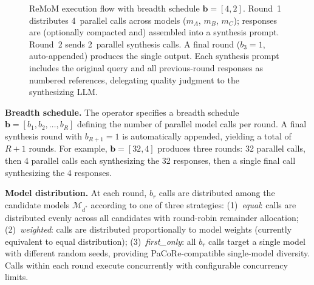 \begin{figure}[t]
{
}
\caption{ReMoM execution flow with breadth schedule $\mathbf{b} = [4, 2]$.
Round~1 distributes 4~parallel calls across models ($m_A$, $m_B$, $m_C$); responses are (optionally compacted and) assembled into a synthesis prompt.
Round~2 sends 2~parallel synthesis calls.
A final round ($b_3 = 1$, auto-appended) produces the single output.
Each synthesis prompt includes the original query and all previous-round responses as numbered references, delegating quality judgment to the synthesizing LLM.}
\label{fig:remom_flow}
\end{figure}

\noindent\textbf{Breadth schedule.}
The operator specifies a breadth schedule $\mathbf{b} = [b_1, b_2, \ldots, b_R]$ defining the number of parallel model calls per round.
A final synthesis round with $b_{R+1} = 1$ is automatically appended, yielding a total of $R+1$ rounds.
For example, $\mathbf{b} = [32, 4]$ produces three rounds: 32 parallel calls, then 4 parallel calls each synthesizing the 32 responses, then a single final call synthesizing the 4 responses.

\noindent\textbf{Model distribution.}
At each round, $b_r$ calls are distributed among the candidate models $\mathcal{M}_{d^*}$ according to one of three strategies:
(1)~\emph{equal}: calls are distributed evenly across all candidates with round-robin remainder allocation;
(2)~\emph{weighted}: calls are distributed proportionally to model weights (currently equivalent to equal distribution);
(3)~\emph{first\_only}: all $b_r$ calls target a single model with different random seeds, providing PaCoRe-compatible single-model diversity.
Calls within each round execute concurrently with configurable concurrency limits.

